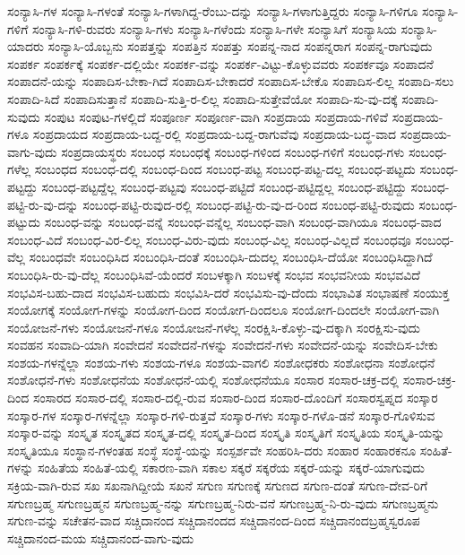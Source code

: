 {ಸಂನ್ಯಾಸಿ-ಗಳ
ಸಂನ್ಯಾಸಿ-ಗಳಂತೆ
ಸಂನ್ಯಾಸಿ-ಗಳಾಗಿದ್ದ-ರೆಂಬು-ದನ್ನು
ಸಂನ್ಯಾಸಿ-ಗಳಾಗುತ್ತಿದ್ದರು
ಸಂನ್ಯಾಸಿ-ಗಳಿಗೂ
ಸಂನ್ಯಾಸಿ-ಗಳಿಗೆ
ಸಂನ್ಯಾಸಿ-ಗಳಿ-ರುವರು
ಸಂನ್ಯಾಸಿ-ಗಳು
ಸಂನ್ಯಾಸಿ-ಗಳೆಂದು
ಸಂನ್ಯಾಸಿ-ಗಳೇ
ಸಂನ್ಯಾಸಿಗೆ
ಸಂನ್ಯಾಸಿಯ
ಸಂನ್ಯಾಸಿ-ಯಾದರು
ಸಂನ್ಯಾಸಿ-ಯೊಬ್ಬನು
ಸಂಪತ್ತನ್ನು
ಸಂಪತ್ತಿನ
ಸಂಪತ್ತು
ಸಂಪನ್ನ-ನಾದ
ಸಂಪನ್ನರಾಗ
ಸಂಪನ್ನ-ರಾಗುವುದು
ಸಂಪರ್ಕ
ಸಂಪರ್ಕಕ್ಕೆ
ಸಂಪರ್ಕ-ದಲ್ಲಿಯೇ
ಸಂಪರ್ಕ-ವನ್ನು
ಸಂಪರ್ಕ-ವಿಟ್ಟು-ಕೊಳ್ಳುವವರು
ಸಂಪರ್ಕವೂ
ಸಂಪಾದನೆ
ಸಂಪಾದನೆ-ಯನ್ನು
ಸಂಪಾದಿಸ-ಬೇಕಾ-ಗಿದೆ
ಸಂಪಾದಿಸ-ಬೇಕಾದರೆ
ಸಂಪಾದಿಸ-ಬೇಕೊ
ಸಂಪಾದಿಸ-ಲಿಲ್ಲ
ಸಂಪಾದಿ-ಸಲು
ಸಂಪಾದಿ-ಸಿದೆ
ಸಂಪಾದಿಸುತ್ತಾನೆ
ಸಂಪಾದಿ-ಸುತ್ತಿ-ರ-ಲಿಲ್ಲ
ಸಂಪಾದಿ-ಸುತ್ತೇವೆಯೋ
ಸಂಪಾದಿ-ಸು-ವು-ದಕ್ಕೆ
ಸಂಪಾದಿ-ಸುವುದು
ಸಂಪುಟ
ಸಂಪುಟ-ಗಳಲ್ಲಿದೆ
ಸಂಪೂರ್ಣ
ಸಂಪೂರ್ಣ-ವಾಗಿ
ಸಂಪ್ರದಾಯ
ಸಂಪ್ರದಾಯ-ಗಳಿವೆ
ಸಂಪ್ರದಾಯ-ಗಳೂ
ಸಂಪ್ರದಾಯದ
ಸಂಪ್ರದಾಯ-ಬದ್ದ-ರಲ್ಲಿ
ಸಂಪ್ರದಾಯ-ಬದ್ದ-ರಾಗುವೆವು
ಸಂಪ್ರದಾಯ-ಬದ್ಧ-ವಾದ
ಸಂಪ್ರದಾಯ-ವಾಗು-ವುದು
ಸಂಪ್ರದಾಯಸ್ಥರು
ಸಂಬಂಧ
ಸಂಬಂಧಕ್ಕೆ
ಸಂಬಂಧ-ಗಳಿಂದ
ಸಂಬಂಧ-ಗಳಿಗೆ
ಸಂಬಂಧ-ಗಳು
ಸಂಬಂಧ-ಗಳೆಲ್ಲ
ಸಂಬಂಧದ
ಸಂಬಂಧ-ದಲ್ಲಿ
ಸಂಬಂಧ-ದಿಂದ
ಸಂಬಂಧ-ಪಟ್ಟ
ಸಂಬಂಧ-ಪಟ್ಟ-ದಲ್ಲ
ಸಂಬಂಧ-ಪಟ್ಟದು
ಸಂಬಂಧ-ಪಟ್ಟದ್ದು
ಸಂಬಂಧ-ಪಟ್ಟದ್ದೆಲ್ಲ
ಸಂಬಂಧ-ಪಟ್ಟವು
ಸಂಬಂಧ-ಪಟ್ಟಿದೆ
ಸಂಬಂಧ-ಪಟ್ಟಿದ್ದಲ್ಲ
ಸಂಬಂಧ-ಪಟ್ಟಿದ್ದು
ಸಂಬಂಧ-ಪಟ್ಟಿ-ರು-ವು-ದನ್ನು
ಸಂಬಂಧ-ಪಟ್ಟಿ-ರುವುದ-ರಲ್ಲಿ
ಸಂಬಂಧ-ಪಟ್ಟಿ-ರು-ವು-ದ-ರಿಂದ
ಸಂಬಂಧ-ಪಟ್ಟಿ-ರುವುದು
ಸಂಬಂಧ-ಪಟ್ಟುದು
ಸಂಬಂಧ-ವನ್ನು
ಸಂಬಂಧ-ವನ್ನೆ
ಸಂಬಂಧ-ವನ್ನೆಲ್ಲ
ಸಂಬಂಧ-ವಾಗಿ
ಸಂಬಂಧ-ವಾಗಿಯೂ
ಸಂಬಂಧ-ವಾದ
ಸಂಬಂಧ-ವಿದೆ
ಸಂಬಂಧ-ವಿರ-ಲಿಲ್ಲ
ಸಂಬಂಧ-ವಿರು-ವುದು
ಸಂಬಂಧ-ವಿಲ್ಲ
ಸಂಬಂಧ-ವಿಲ್ಲದೆ
ಸಂಬಂಧವೂ
ಸಂಬಂಧ-ವೆಲ್ಲ
ಸಂಬಂಧವೇ
ಸಂಬಂಧಿಸಿದ
ಸಂಬಂಧಿಸಿ-ದಂತೆ
ಸಂಬಂಧಿಸಿ-ದುದಲ್ಲ
ಸಂಬಂಧಿಸಿ-ದೆಯೋ
ಸಂಬಂಧಿಸಿದ್ದಾಗಿದೆ
ಸಂಬಂಧಿಸಿ-ರು-ವು-ದೆಲ್ಲ
ಸಂಬಂಧಿಸಿವೆ-ಯೆಂದರೆ
ಸಂಬಳಕ್ಕಾಗಿ
ಸಂಬಳಕ್ಕೆ
ಸಂಭವ
ಸಂಭವನೀಯ
ಸಂಭವವಿದೆ
ಸಂಭವಿಸ-ಬಹು-ದಾದ
ಸಂಭವಿಸ-ಬಹುದು
ಸಂಭವಿಸಿ-ದರೆ
ಸಂಭವಿಸು-ವು-ದೆಂದು
ಸಂಭಾವಿತ
ಸಂಭಾಷಣೆ
ಸಂಯುಕ್ತ
ಸಂಯೋಗಕ್ಕೆ
ಸಂಯೋಗ-ಗಳನ್ನು
ಸಂಯೋಗ-ದಿಂದ
ಸಂಯೋಗ-ದಿಂದಲೂ
ಸಂಯೋಗ-ದಿಂದಲೇ
ಸಂಯೋಗ-ವಾಗಿ
ಸಂಯೋಜನೆ-ಗಳು
ಸಂಯೋಜನೆ-ಗಳೂ
ಸಂಯೋಜನೆ-ಗಳೆಲ್ಲ
ಸಂರಕ್ಷಿಸಿ-ಕೊಳ್ಳು-ವು-ದಕ್ಕಾಗಿ
ಸಂರಕ್ಷಿಸು-ವುದು
ಸಂವಹನ
ಸಂವಾದಿ-ಯಾಗಿ
ಸಂವೇದನೆ
ಸಂವೇದನೆ-ಗಳನ್ನು
ಸಂವೇದನೆ-ಗಳು
ಸಂವೇದನೆ-ಯನ್ನು
ಸಂವೇದಿಸ-ಬೇಕು
ಸಂಶಯ-ಗಳನ್ನೆಲ್ಲಾ
ಸಂಶಯ-ಗಳು
ಸಂಶಯ-ಗಳೂ
ಸಂಶಯ-ವಾಗಲಿ
ಸಂಶೋಧಕರು
ಸಂಶೋಧನಾ
ಸಂಶೋಧನೆ
ಸಂಶೋಧನೆ-ಗಳು
ಸಂಶೋಧನೆಯ
ಸಂಶೋಧನೆ-ಯಲ್ಲಿ
ಸಂಶೋಧನೆಯೂ
ಸಂಸಾರ
ಸಂಸಾರ-ಚಕ್ರ-ದಲ್ಲಿ
ಸಂಸಾರ-ಚಕ್ರ-ದಿಂದ
ಸಂಸಾರದ
ಸಂಸಾರ-ದಲ್ಲಿ
ಸಂಸಾರ-ದಲ್ಲಿ-ರುವ
ಸಂಸಾರ-ದಿಂದ
ಸಂಸಾರ-ದೊಂದಿಗೆ
ಸಂಸಾರಸ್ವಪ್ನದ
ಸಂಸ್ಕಾರ
ಸಂಸ್ಕಾರ-ಗಳ
ಸಂಸ್ಕಾರ-ಗಳನ್ನೆಲ್ಲಾ
ಸಂಸ್ಕಾರ-ಗಳಿ-ರುತ್ತವೆ
ಸಂಸ್ಕಾರ-ಗಳು
ಸಂಸ್ಕಾರ-ಗಳೊ-ಡನೆ
ಸಂಸ್ಕಾರ-ಗೊಳಿಸುವ
ಸಂಸ್ಕಾರ-ವನ್ನು
ಸಂಸ್ಕೃತ
ಸಂಸ್ಕೃತದ
ಸಂಸ್ಕೃತ-ದಲ್ಲಿ
ಸಂಸ್ಕೃತ-ದಿಂದ
ಸಂಸ್ಕೃತಿ
ಸಂಸ್ಕೃತಿಗೆ
ಸಂಸ್ಕೃತಿಯ
ಸಂಸ್ಕೃತಿ-ಯನ್ನು
ಸಂಸ್ಕೃತಿಯೂ
ಸಂಸ್ಥಾನ-ಗಳಂತಹ
ಸಂಸ್ಥೆ
ಸಂಸ್ಥೆ-ಯನ್ನು
ಸಂಸ್ಪರ್ಶವೇ
ಸಂಹರಿಸಿ-ದರು
ಸಂಹಾರ
ಸಂಹಾರಕನೂ
ಸಂಹಿತೆ-ಗಳನ್ನು
ಸಂಹಿತೆಯ
ಸಂಹಿತೆ-ಯಲ್ಲಿ
ಸಕಾರಣ-ವಾಗಿ
ಸಕಾಲ
ಸಕ್ಕರೆ
ಸಕ್ಕರೆಯ
ಸಕ್ಕರೆ-ಯನ್ನು
ಸಕ್ಕರೆ-ಯಾಗುವುದು
ಸಕ್ರಿಯ-ವಾಗಿ-ರುವ
ಸಖ
ಸಖನಾಗಿದ್ದೀಯೆ
ಸಖನೆ
ಸಗುಣ
ಸಗುಣಕ್ಕೆ
ಸಗುಣದ
ಸಗುಣ-ದಂತೆ
ಸಗುಣ-ದೇವ-ರಿಗೆ
ಸಗುಣಬ್ರಹ್ಮ
ಸಗುಣಬ್ರಹ್ಮನ
ಸಗುಣಬ್ರಹ್ಮ-ನನ್ನು
ಸಗುಣಬ್ರಹ್ಮ-ನಿರು-ವನೆ
ಸಗುಣಬ್ರಹ್ಮ-ನಿ-ರು-ವುದು
ಸಗುಣಬ್ರಹ್ಮನು
ಸಗುಣ-ವನ್ನು
ಸಚೇತನ-ವಾದ
ಸಚ್ಚಿದಾನಂದ
ಸಚ್ಚಿದಾನಂದದ
ಸಚ್ಚಿದಾನಂದ-ದಿಂದ
ಸಚ್ಚಿದಾನಂದಬ್ರಹ್ಮಸ್ವರೂಪ
ಸಚ್ಚಿದಾನಂದ-ಮಯ
ಸಚ್ಚಿದಾನಂದ-ವಾಗು-ವುದು
}
